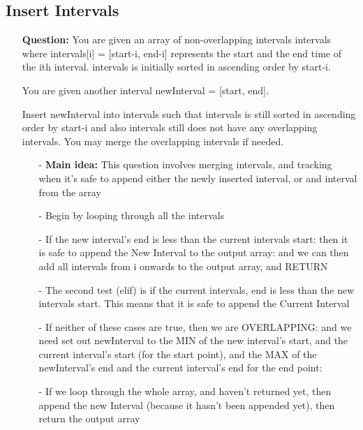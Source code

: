 \documentclass[12pt]{article}
\begin{document}
\subsection{Insert Intervals}
\begin{enumerate}
  \item[] \textbf{Question:} You are given an array of non-overlapping intervals intervals where intervals[i] = [start-i, end-i] represents the start and the end time of the ith interval. intervals is initially sorted in ascending order by start-i.

You are given another interval newInterval = [start, end].

Insert newInterval into intervals such that intervals is still sorted in ascending order by start-i and also intervals still does not have any overlapping intervals. You may merge the overlapping intervals if needed.

    \begin{enumerate}
      \item[-] \textbf{Main idea:} This question involves merging intervals, and tracking when it's safe to append either the newly inserted interval, or and interval from the array
      \item[-] Begin by looping through all the intervals
      \item[-] If the new interval's end is less than the current intervals start: then it is safe to append the New Interval to the output array: and we can then add all intervals from i onwards to the output array, and RETURN
      \item[-] The second test (elif) is if the current intervals, end is less than the new intervals start. This means that it is safe to append the Current Interval
      \item[-] If neither of these cases are true, then we are OVERLAPPING: and we need set out newInterval to the MIN of the new interval's start, and the current interval's start (for the start point), and the MAX of the newInterval's end and the current interval's end for the end point: 
      \item[-] If we loop through the whole array, and haven't returned yet, then append the new Interval (because it hasn't been appended yet), then return the output array

    \end{enumerate}

\end{enumerate}
\end{document}
